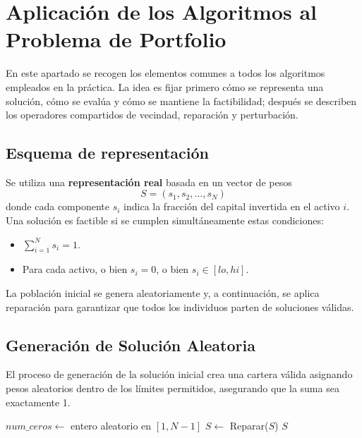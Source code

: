 \section{Aplicación de los Algoritmos al Problema de Portfolio}
\label{sec:aplicacion}

En este apartado se recogen los elementos comunes a todos los algoritmos empleados en la práctica. La idea es fijar primero cómo se representa una solución, cómo se evalúa y cómo se mantiene la factibilidad; después se describen los operadores compartidos de vecindad, reparación y perturbación.

\subsection{Esquema de representación}
Se utiliza una \textbf{representación real} basada en un vector de pesos
$$
S = (s_1, s_2, \dots, s_N)
$$
donde cada componente $s_i$ indica la fracción del capital invertida en el activo $i$. Una solución es factible si se cumplen simultáneamente estas condiciones:
\begin{itemize}
    \item $\sum_{i=1}^N s_i = 1$.
    \item Para cada activo, o bien $s_i = 0$, o bien $s_i \in [lo, hi]$.
\end{itemize}

La población inicial se genera aleatoriamente y, a continuación, se aplica reparación para garantizar que todos los individuos parten de soluciones válidas.

\subsection{Generación de Solución Aleatoria}
El proceso de generación de la solución inicial crea una cartera válida asignando pesos aleatorios dentro de los límites permitidos, asegurando que la suma sea exactamente 1.

\begin{algorithm}[H]
\SetAlgoLined
{}

$num\_ceros \leftarrow$ entero aleatorio en $[1, N-1]$\;
$S \leftarrow$ Reparar($S$)\;
\Return $S$\;
\caption{Generación de Solución Aleatoria}
\label{alg:gen-aleatoria}
\end{algorithm}

